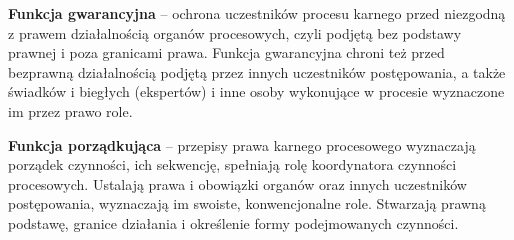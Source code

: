 \textbf{Funkcja gwarancyjna} – ochrona uczestników procesu karnego przed niezgodną z prawem działalnością organów procesowych, czyli podjętą bez podstawy prawnej i poza granicami prawa. Funkcja gwarancyjna chroni też przed bezprawną działalnością podjętą przez innych uczestników postępowania, a także świadków i biegłych (ekspertów) i inne osoby wykonujące w procesie wyznaczone im przez prawo role.

\textbf{Funkcja porządkująca} – przepisy prawa karnego procesowego wyznaczają porządek czynności, ich sekwencję, spełniają rolę koordynatora czynności procesowych. Ustalają prawa i obowiązki organów oraz innych uczestników postępowania, wyznaczają im swoiste, konwencjonalne role. Stwarzają prawną podstawę, granice działania i określenie formy podejmowanych czynności.
